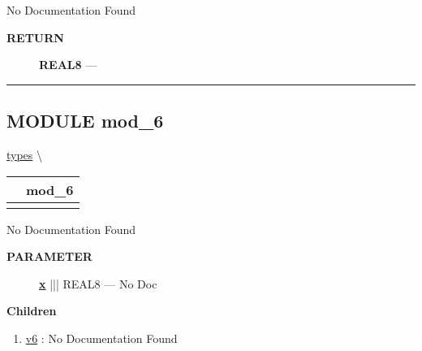 No Documentation Found








\par
\begin{description}
\item [\colorbox{tagtype}{\color{white} \textbf{\textsf{RETURN}}}] \textbf{REAL8} --- 
\end{description}




\rule{\linewidth}{0.5pt}


\subsection*{\textsf{\colorbox{headtoc}{\color{white} MODULE}
mod\_6}}

\hypertarget{ecldoc:types.mod_6}{}
\hspace{0pt} \hyperlink{ecldoc:types}{types} \textbackslash 

{\renewcommand{\arraystretch}{1.5}
\begin{tabularx}{\textwidth}{|>{\raggedright\arraybackslash}l|X|}
\hline
\hspace{0pt}\mytexttt{\color{red} } & \textbf{mod\_6} \\
\hline
\multicolumn{2}{|>{\raggedright\arraybackslash}X|}{\hspace{0pt}\mytexttt{\color{param} (REAL8 x)}} \\
\hline
\end{tabularx}
}

\par





No Documentation Found






\par
\begin{description}
\item [\colorbox{tagtype}{\color{white} \textbf{\textsf{PARAMETER}}}] \textbf{\underline{x}} ||| REAL8 --- No Doc
\end{description}






\textbf{Children}
\begin{enumerate}
\item \hyperlink{ecldoc:types.mod_5.v6}{v6}
: No Documentation Found
\end{enumerate}

